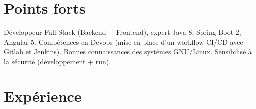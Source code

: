 \documentclass[a4paper]{twentysecondcv} %
\begin{document}

\aboutme{} %






\makeprofile %


\section{Points forts}

Développeur Full Stack (Backend + Frontend), expert Java 8, Spring Boot 2, Angular 5. Compétences en Devops (mise en place d'un workflow CI/CD avec Gitlab et Jenkins). Bonnes connaissances des systèmes GNU/Linux. Sensibilisé à la sécurité (développement + run).


\section{Expérience}
\end{document}
